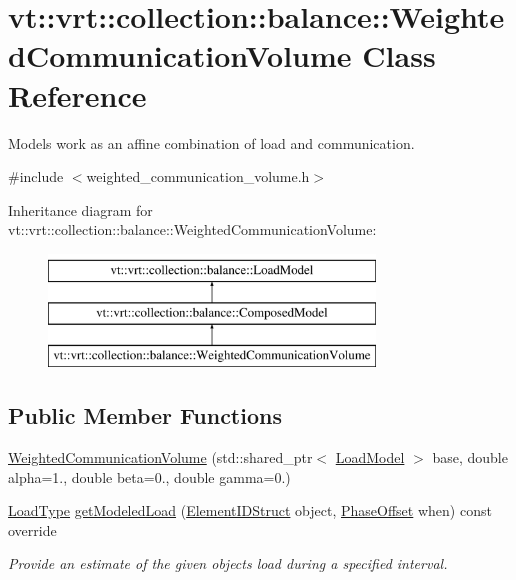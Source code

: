 \hypertarget{classvt_1_1vrt_1_1collection_1_1balance_1_1_weighted_communication_volume}{}\section{vt\+:\+:vrt\+:\+:collection\+:\+:balance\+:\+:Weighted\+Communication\+Volume Class Reference}
\label{classvt_1_1vrt_1_1collection_1_1balance_1_1_weighted_communication_volume}


Models work as an affine combination of load and communication.  




{\ttfamily \#include $<$weighted\+\_\+communication\+\_\+volume.\+h$>$}

Inheritance diagram for vt\+:\+:vrt\+:\+:collection\+:\+:balance\+:\+:Weighted\+Communication\+Volume\+:\begin{figure}[H]
\begin{center}
\leavevmode
\includegraphics[height=3.000000cm]{classvt_1_1vrt_1_1collection_1_1balance_1_1_weighted_communication_volume}
\end{center}
\end{figure}
\subsection*{Public Member Functions}
\begin{DoxyCompactItemize}
\item 
\hyperlink{classvt_1_1vrt_1_1collection_1_1balance_1_1_weighted_communication_volume_a168729402b8779925cdfcbc8e67b15bb}{Weighted\+Communication\+Volume} (std\+::shared\+\_\+ptr$<$ \hyperlink{structvt_1_1vrt_1_1collection_1_1balance_1_1_load_model}{Load\+Model} $>$ base, double alpha=1., double beta=0., double gamma=0.)
\item 
\hyperlink{namespacevt_a8fb51741340b87d7aaee0bef60e9896b}{Load\+Type} \hyperlink{classvt_1_1vrt_1_1collection_1_1balance_1_1_weighted_communication_volume_ac299625caaf27a5cce2ce3060361c51d}{get\+Modeled\+Load} (\hyperlink{namespacevt_1_1vrt_1_1collection_1_1balance_a9f5b53fafb270212279a4757d2c4cd28}{Element\+I\+D\+Struct} object, \hyperlink{structvt_1_1vrt_1_1collection_1_1balance_1_1_phase_offset}{Phase\+Offset} when) const override
\begin{DoxyCompactList}\small\item\em Provide an estimate of the given object\textquotesingle{}s load during a specified interval. \end{DoxyCompactList}\end{DoxyCompactItemize}
